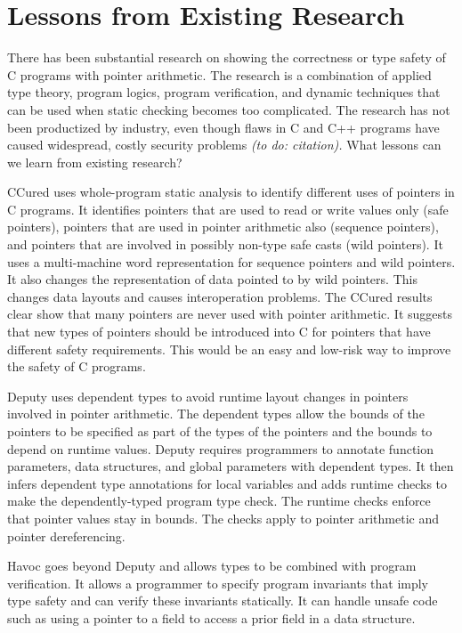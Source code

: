 


\chapter{Lessons from Existing Research}\label{lessons-from-existing-research}

There has been substantial research on showing the correctness or type
safety of C programs with pointer arithmetic. The research is a
combination of applied type theory, program logics, program
verification, and dynamic techniques that can be used when static
checking becomes too complicated. The research has not been productized
by industry, even though flaws in C and C++ programs have caused
widespread, costly security problems \emph{(to do: citation).} What
lessons can we learn from existing research?

CCured uses whole-program static analysis to identify different uses of
pointers in C programs. It identifies pointers that are used to read or
write values only (safe pointers), pointers that are used in pointer
arithmetic also (sequence pointers), and pointers that are involved in
possibly non-type safe casts (wild pointers). It uses a multi-machine
word representation for sequence pointers and wild pointers. It also
changes the representation of data pointed to by wild pointers. This
changes data layouts and causes interoperation problems. The CCured
results clear show that many pointers are never used with pointer
arithmetic. It suggests that new types of pointers should be introduced
into C for pointers that have different safety requirements. This would
be an easy and low-risk way to improve the safety of C programs.

Deputy uses dependent types to avoid runtime layout changes in pointers
involved in pointer arithmetic. The dependent types allow the bounds of
the pointers to be specified as part of the types of the pointers and
the bounds to depend on runtime values. Deputy requires programmers to
annotate function parameters, data structures, and global parameters
with dependent types. It then infers dependent type annotations for
local variables and adds runtime checks to make the dependently-typed
program type check. The runtime checks enforce that pointer values stay
in bounds. The checks apply to pointer arithmetic and pointer
dereferencing.

Havoc goes beyond Deputy and allows types to be combined with program
verification. It allows a programmer to specify program invariants that
imply type safety and can verify these invariants statically. It can
handle unsafe code such as using a pointer to a field to access a prior
field in a data structure.


